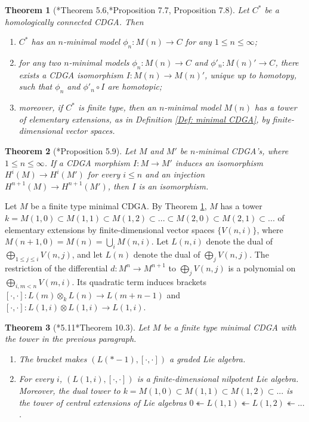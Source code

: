 \documentclass[11pt]{amsart}
\newtheorem{theorem}{Theorem}[section]
\theoremstyle{definition}
\numberwithin{equation}{section}
\numberwithin{equation}{section}
\begin{document}
\begin{theorem}[\cite{Morgan-hodge-theory}*{Theorem 5.6},\cite{Bousfield-Gugenheim-rational-homotopy}*{Proposition 7.7, Proposition 7.8}]\label{Fact: Lifting of minimal models}
Let $C^*$ be a homologically connected CDGA. Then
\begin{enumerate}[leftmargin=0.25in]
    \item $C^*$ has an $n$-minimal model $\phi_n:M(n)\rightarrow C$ for any $1\leq n\leq \infty$;
    \item for any two $n$-minimal models $\phi_n:M(n)\rightarrow C$ and $\phi'_n:M(n)'\rightarrow C$, there exists a CDGA isomorphism $I:M(n)\rightarrow M(n)'$, unique up to homotopy, such that $\phi_n$ and $\phi'_n\circ I$ are homotopic;
    \item moreover, if $C^*$ is finite type, then an $n$-minimal model $M(n)$ has a tower of elementary extensions, as in Definition \ref{Def: minimal CDGA}, by finite-dimensional vector spaces.
\end{enumerate}
\end{theorem}

\begin{theorem}[\cite{Morgan-hodge-theory}*{Proposition 5.9}]\label{Fact: Uniqueness of minimal models}
Let $M$ and $M'$ be $n$-minimal CDGA's, where $1\leq n\leq \infty$. If a CDGA morphism $I:M\rightarrow M'$ induces an isomorphism $H^i(M)\rightarrow H^i(M')$ for every $i
\leq n$ and an injection $H^{n+1}(M)\rightarrow H^{n+1}(M')$, then $I$ is an isomorphism.
\end{theorem}

Let $M$ be a finite type minimal CDGA. By Theorem \ref{Fact: Lifting of minimal models}, $M$ has a tower $k=M(1,0)\subset M(1,1)\subset M(1,2)\subset ...\subset M(2,0)\subset  M(2,1)\subset ...$ of elementary extensions by finite-dimensional vector spaces $\{V(n,i)\}$, where $M(n+1,0)=M(n)=\bigcup_i M(n,i)$. Let $L(n,i)$ denote the dual of $\bigoplus_{1\leq j\leq i}V(n,j)$, and let $L(n)$ denote the dual of $\bigoplus_{j}V(n,j)$. The restriction of the differential $d:M^n\rightarrow M^{n+1}$ to $\bigoplus_j V(n,j)$ is a polynomial on $\bigoplus_{i,m<n}V(m,i)$. Its quadratic term induces brackets $[\cdot,\cdot]:L(m)\otimes_k L(n)\rightarrow L(m+n-1)$ and $[\cdot,\cdot]:L(1,i)\otimes L(1,i)\rightarrow L(1,i)$.

\begin{theorem}[\cite{Morgan-hodge-theory}*{5.11}\cite{MGriffiths-Morgan-rational-homotopy}*{Theorem 10.3}]\label{Fact: nilpotent Lie algebra induced from minimal model}
Let $M$ be a finite type minimal CDGA with the tower in the previous paragraph.
\begin{enumerate}[leftmargin=0.25in]
    \item The bracket makes $(L(*-1),[\cdot,\cdot])$ a graded Lie algebra.
    \item For every $i$, $(L(1,i),[\cdot,\cdot])$ is a finite-dimensional nilpotent Lie algebra. Moreover, the dual tower to $k=M(1,0)\subset M(1,1)\subset M(1,2)\subset ...$ is the tower of central extensions of Lie algebras $0 \twoheadleftarrow L(1,1)\twoheadleftarrow L(1,2)\twoheadleftarrow ...$.
\end{enumerate}
\end{theorem}
\end{document}
